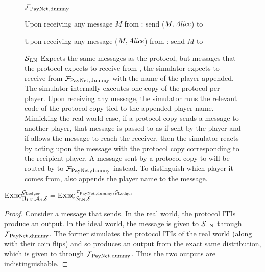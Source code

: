 \begin{figure}[H]
  \begin{systembox}{$\mathcal{F}_{\mathrm{PayNet}}{}_{\mathrm{, dummy}}$}
    \begin{algorithmic}[1]
      \State Upon receiving any message $M$ from \alice:
      \Indent
          \State send ($M, \mathit{Alice}$) to \simulator
        \EndIf
      \EndIndent
      \Statex

      \State Upon receiving any message ($M, \mathit{Alice}$) from \simulator:
      \Indent
          \State send $M$ to \alice
        \EndIf
      \EndIndent
    \end{algorithmic}
  \end{systembox}
  \caption{}
  \label{alg:proof:fpaynet:dummy}
\end{figure}

\begin{figure}[H]
  \begin{simulatorbox}{$\mathcal{S}{}_{\mathrm{LN}}$}
    Expects the same messages as the protocol, but messages that the protocol
    expects to receive from \environment, the simulator expects to receive
    from $\mathcal{F}_{\mathrm{PayNet}}{}_{\mathrm{, dummy}}$ with the name of the player appended.
    The simulator internally executes one copy of the protocol per player.
    Upon receiving any message, the simulator runs the relevant code of the
    protocol copy tied to the appended player name. Mimicking the real-world
    case, if a protocol copy sends a message to another player, that message
    is passed to \adversary{} as if sent by the player and if \adversary{}
    allows the message to reach the receiver, then the simulator reacts by
    acting upon the message with the protocol copy corresponding to the
    recipient player. A message sent by a protocol copy to \environment{} will
    be routed by \simulator{} to $\mathcal{F}_{\mathrm{PayNet}}{}_{\mathrm{, dummy}}$ instead. To
    distinguish which player it comes from, \simulator{} also appends the
    player name to the message.
  \end{simulatorbox}
  \caption{}
  \label{alg:sim:ln}
\end{figure}

\begin{lemma}
  \label{lemma:dummy}
  $\textsc{Exec}^{\mathcal{G}_{\mathrm{Ledger}}}_{\Pi_{\mathrm{LN}}, \mathcal{A}_{\mathrm{d}},
  \mathcal{E}} = \textsc{Exec}^{\mathcal{F}_{\mathrm{PayNet}}{}_{\mathrm{, dummy}},
  \mathcal{G}_{\mathrm{Ledger}}}_{\mathcal{S}_{\mathrm{LN}}, \mathcal{E}}$
\end{lemma}

\begin{proof}
  Consider a message that \environment{} sends. In the real world, the
  protocol ITIs produce an output. In the ideal world, the message is given to
  $\mathcal{S}{}_{\mathrm{LN}}$ through $\mathcal{F}_{\mathrm{PayNet}}{}_{\mathrm{, dummy}}$. The
  former simulates the protocol ITIs of the real world (along with their coin
  flips) and so produces an output from the exact same distribution, which is
  given to \environment{} through $\mathcal{F}_{\mathrm{PayNet}}{}_{\mathrm{, dummy}}$. Thus the
  two outputs are indistinguishable.
\end{proof}

